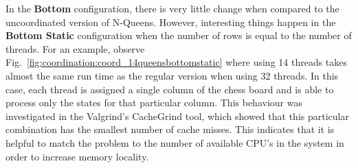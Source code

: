 In the \textbf{Bottom} configuration, there is very little change when compared
to the uncoordinated version of N-Queens. However, interesting things happen in
the \textbf{Bottom Static} configuration when the number of rows is equal to the
number of threads. For an example, observe
Fig.~\ref{fig:coordination:coord_14queensbottomstatic} where using 14 threads
takes almost the same run time as the regular version when using 32 threads.
In this case, each thread is assigned a single column of the chess
board and is able to process only the states for that particular column. This
behaviour was investigated in the Valgrind's CacheGrind tool, which showed that
this particular combination has the smallest number of cache misses. This
indicates that it is helpful to match the problem to the number of available
CPU's in the system in order to increase memory locality.


